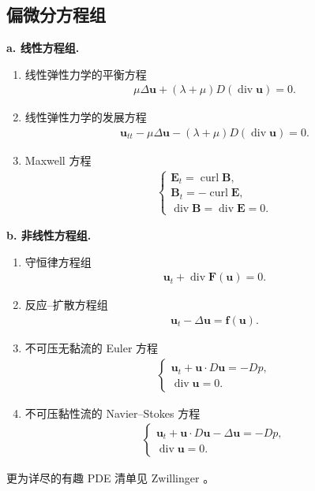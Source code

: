 \documentclass[../../main.tex]{subfiles}
\begin{document}
\subsection{偏微分方程组}\label{subsection:ch01-systems}

\textbf{a. 线性方程组.}
\begin{enumerate}
\item 线性弹性力学的平衡方程
\begin{align*}
\mu\Delta\mathbf{u}+(\lambda+\mu)D(\operatorname{div}\mathbf{u})=0.
\end{align*}
\item 线性弹性力学的发展方程
\begin{align*}
\mathbf{u}_{tt}-\mu\Delta\mathbf{u}-(\lambda+\mu)D(\operatorname{div}\mathbf{u})=0.
\end{align*}
\item Maxwell 方程
\begin{align*}
\begin{cases}
\mathbf{E}_t=\operatorname{curl}\mathbf{B},\\
\mathbf{B}_t=-\operatorname{curl}\mathbf{E},\\
\operatorname{div}\mathbf{B}=\operatorname{div}\mathbf{E}=0.
\end{cases}
\end{align*}
\end{enumerate}

\textbf{b. 非线性方程组.}
\begin{enumerate}
\item 守恒律方程组
\begin{align*}
\mathbf{u}_t+\operatorname{div}\mathbf{F}(\mathbf{u})=0.
\end{align*}
\item 反应--扩散方程组
\begin{align*}
\mathbf{u}_t-\Delta\mathbf{u}=\mathbf{f}(\mathbf{u}).
\end{align*}
\item 不可压无黏流的 Euler 方程
\begin{align*}
\begin{cases}
\mathbf{u}_t+\mathbf{u}\cdot D\mathbf{u}=-Dp,\\
\operatorname{div}\mathbf{u}=0.
\end{cases}
\end{align*}
\item 不可压黏性流的 Navier--Stokes 方程
\begin{align*}
\begin{cases}
\mathbf{u}_t+\mathbf{u}\cdot D\mathbf{u}-\Delta\mathbf{u}=-Dp,\\
\operatorname{div}\mathbf{u}=0.
\end{cases}
\end{align*}
\end{enumerate}

更为详尽的有趣 PDE 清单见 Zwillinger \cite{Zw}。
\end{document}
